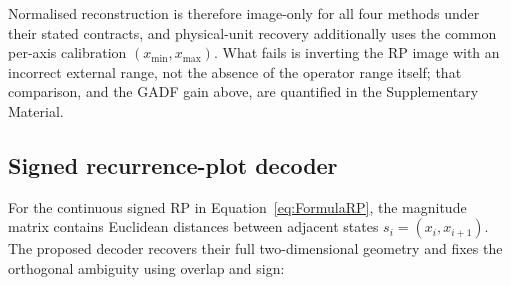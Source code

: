 \documentclass[preprint,12pt]{elsarticle}
\begin{document}
Normalised reconstruction is therefore image-only for all four methods under their stated contracts, and physical-unit recovery additionally uses the common per-axis calibration \((x_{\min},x_{\max})\). What fails is inverting the RP image with an incorrect external range, not the absence of the operator range itself; that comparison, and the GADF gain above, are quantified in the Supplementary Material.

\subsection{Signed recurrence-plot decoder}\label{sec:rp_reconstruction_method}

For the continuous signed RP in Equation~\ref{eq:FormulaRP}, the magnitude matrix contains Euclidean distances between adjacent states \(s_i=(x_i,x_{i+1})\). The proposed decoder recovers their full two-dimensional geometry and fixes the orthogonal ambiguity using overlap and sign:
\end{document}
